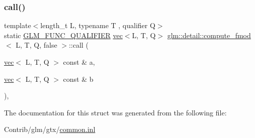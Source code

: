 \subsubsection{\texorpdfstring{call()}{call()}}
{\footnotesize\ttfamily template$<$length\+\_\+t L, typename T , qualifier Q$>$ \\
static \mbox{\hyperlink{setup_8hpp_a33fdea6f91c5f834105f7415e2a64407}{G\+L\+M\+\_\+\+F\+U\+N\+C\+\_\+\+Q\+U\+A\+L\+I\+F\+I\+ER}} \mbox{\hyperlink{structglm_1_1vec}{vec}}$<$L, T, Q$>$ \mbox{\hyperlink{structglm_1_1detail_1_1compute__fmod}{glm\+::detail\+::compute\+\_\+fmod}}$<$ L, T, Q, false $>$\+::call (\begin{DoxyParamCaption}\item[{\mbox{\hyperlink{structglm_1_1vec}{vec}}$<$ L, T, Q $>$ const \&}]{a,  }\item[{\mbox{\hyperlink{structglm_1_1vec}{vec}}$<$ L, T, Q $>$ const \&}]{b }\end{DoxyParamCaption})\hspace{0.3cm}{\ttfamily [inline]}, {\ttfamily [static]}}



The documentation for this struct was generated from the following file\+:\begin{DoxyCompactItemize}
\item 
Contrib/glm/gtx/\mbox{\hyperlink{common_8inl}{common.\+inl}}\end{DoxyCompactItemize}
